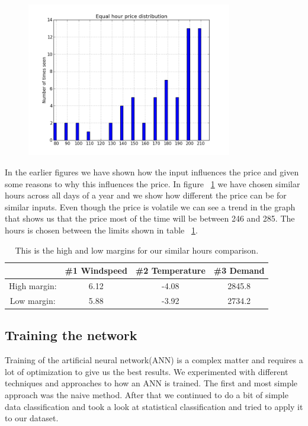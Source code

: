 \begin{figure}[H]
\centering
\includegraphics[width=0.8\textwidth ,natwidth=410,natheight=237]{billeder/energy_price_plots/same_hour_distribution.png}
\caption{}
\label{fig:same_hour_distribution}
\end{figure}

In the earlier figures we have shown how the input influences the price and given some reasons to why this influences the price. In figure ~\ref{fig:same_hour_distribution} we have chosen similar hours across all days of a year and we show how different the price can be for similar inputs. Even though the price is volatile we can see a trend in the graph that shows us that the price most of the time will be between 246 and 285. The hours is chosen between the limits shown in table ~\ref{table:similarHoursLimits}.

\begin{table}[H]
\centering  %
\begin{tabular}{c c c c} %
 & \#1 Windspeed & \#2 Temperature & \#3 Demand \\ [0.5ex] %
\hline                  %
High margin: & 6.12 & -4.08 & 2845.8  \\
Low margin: & 5.88 & -3.92 & 2734.2 \\ [1ex] %
\hline %
\end{tabular}
\caption{This is the high and low margins for our similar hours comparison.} %
\label{table:similarHoursLimits} %
\end{table}

\subsection{Training the network}
Training of the artificial neural network(ANN) is a complex matter and requires a lot of optimization to give us the best results. We experimented with different techniques and approaches to how an ANN is trained. The first and most simple approach was the naive method. After that we continued to do a bit of simple data classification and took a look at statistical classification and tried to apply it to our dataset.
